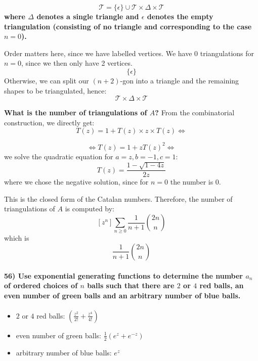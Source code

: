 \documentclass[
]{article}
\providecommand{\tightlist}{%
  \setlength{\itemsep}{0pt}\setlength{\parskip}{0pt}}
\begin{document}
\[
\mathcal{T} = \{\epsilon\} \cup \mathcal{T} \times \Delta \times \mathcal{T}
\] \textbf{where \(\Delta\) denotes a single triangle and \(\epsilon\)
denotes the empty triangulation (consisting of no triangle and
corresponding to the case \(n=0\)).}

Order matters here, since we have labelled vertices. We have \(0\)
triangulations for \(n=0\), since we then only have 2 vertices.
\[\{\epsilon\}\] Otherwise, we can split our \((n+2)\)-gon into a
triangle and the remaining shapes to be triangulated, hence: \[
\mathcal{T} \times \Delta \times \mathcal{T}
\]

\textbf{What is the number of triangulations of \(A\)?} From the
combinatorial construction, we directly get: \[
T(z) = 1 + T(z) \times z \times T(z) \Leftrightarrow
\]

\[
\Leftrightarrow T(z) = 1 + zT(z)^2 \Leftrightarrow
\] we solve the quadratic equation for \(a=z, b = -1, c = 1\): \[
T(z)= \frac{1- \sqrt{1-4z}}{2z}
\] where we chose the negative solution, since for \(n=0\) the number is
0.

This is the closed form of the Catalan numbers. Therefore, the number of
triangulations of \(A\) is computed by: \[
[z^n]\sum_{n \geq 0} \frac{1}{n+1} \binom{2n}{n}
\] which is \[
 \frac{1}{n+1} \binom{2n}{n}
\]

\hypertarget{use-exponential-generating-functions-to-determine-the-number-a_n-of-ordered-choices-of-n-balls-such-that-there-are-2-or-4-red-balls-an-even-number-of-green-balls-and-an-arbitrary-number-of-blue-balls.}{%
\paragraph{\texorpdfstring{56) Use exponential generating functions to
determine the number \(a_n\) of ordered choices of \(n\) balls such that
there are \(2\) or \(4\) red balls, an even number of green balls and an
arbitrary number of blue
balls.}{56) Use exponential generating functions to determine the number a\_n of ordered choices of n balls such that there are 2 or 4 red balls, an even number of green balls and an arbitrary number of blue balls.}}\label{use-exponential-generating-functions-to-determine-the-number-a_n-of-ordered-choices-of-n-balls-such-that-there-are-2-or-4-red-balls-an-even-number-of-green-balls-and-an-arbitrary-number-of-blue-balls.}}

\begin{itemize}
\tightlist
\item
  \(2\) or \(4\) red balls: \((\frac{z^2}{2!} + \frac{z^4}{4!})\)
\item
  even number of green balls: \(\frac{1}{2}(e^z + e^{-z})\)
\item
  arbitrary number of blue balls: \(e^z\)
\end{itemize}
\end{document}
